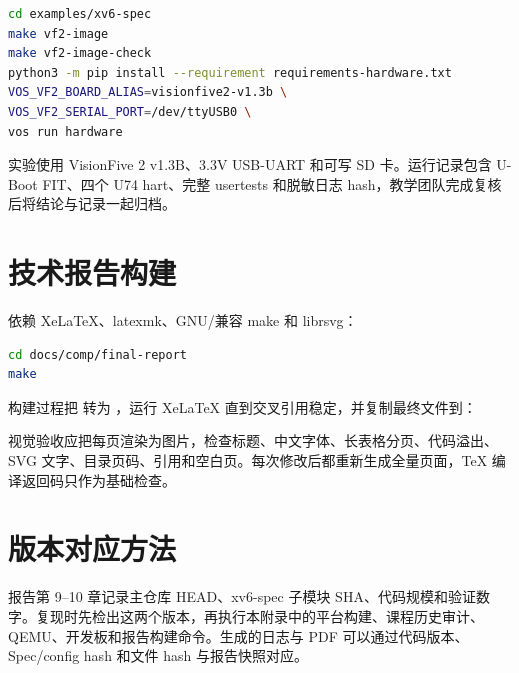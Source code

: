\begin{lstlisting}[language=bash]
cd examples/xv6-spec
make vf2-image
make vf2-image-check
python3 -m pip install --requirement requirements-hardware.txt
VOS_VF2_BOARD_ALIAS=visionfive2-v1.3b \
VOS_VF2_SERIAL_PORT=/dev/ttyUSB0 \
vos run hardware
\end{lstlisting}

实验使用 VisionFive 2 v1.3B、3.3V USB-UART 和可写 SD 卡。运行记录包含 U-Boot FIT、四个 U74 hart、完整 usertests 和脱敏日志 hash，教学团队完成复核后将结论与记录一起归档。

\section{技术报告构建}

依赖 XeLaTeX、latexmk、GNU/兼容 make 和 librsvg：

\begin{lstlisting}[language=bash]
cd docs/comp/final-report
make
\end{lstlisting}

构建过程把  转为 ，运行 XeLaTeX 直到交叉引用稳定，并复制最终文件到：

\begin{center}
\end{center}

视觉验收应把每页渲染为图片，检查标题、中文字体、长表格分页、代码溢出、SVG 文字、目录页码、引用和空白页。每次修改后都重新生成全量页面，TeX 编译返回码只作为基础检查。

\section{版本对应方法}

报告第 9--10 章记录主仓库 HEAD、xv6-spec 子模块 SHA、代码规模和验证数字。复现时先检出这两个版本，再执行本附录中的平台构建、课程历史审计、QEMU、开发板和报告构建命令。生成的日志与 PDF 可以通过代码版本、Spec/config hash 和文件 hash 与报告快照对应。
